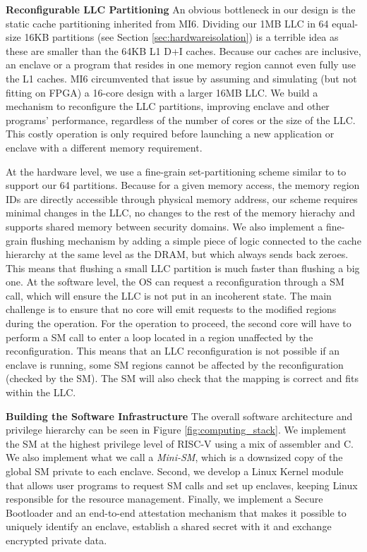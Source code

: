 \noindent\textbf{Reconfigurable LLC Partitioning}
\label{sec:dynamiccache}
An obvious bottleneck in our design is the static cache partitioning inherited from MI6.
Dividing our 1MB LLC in 64 equal-size 16KB partitions (see Section \ref{sec:hardwareisolation}) is a terrible idea as these are
smaller than the 64KB L1 D+I caches.
Because our caches are inclusive, an enclave or a program that resides in one memory region cannot even fully use the L1 caches.
MI6 circumvented that issue by assuming and simulating (but not fitting on FPGA) a 16-core design with a larger 16MB LLC.
We build a mechanism to reconfigure the LLC partitions, improving enclave and other programs' performance, regardless of the number of cores or the size of the LLC.
This costly operation is only required before launching a new application or enclave with a different memory requirement.

At the hardware level, we use a fine-grain set-partitioning scheme similar to \cite{townley2022composable,saileshwar2021bespoke} to support our 64 partitions.
Because for a given memory access, the memory region IDs are directly accessible through physical memory address, our scheme requires minimal changes in the LLC, no changes to the rest of the memory hierachy and supports shared memory between security domains.
We also implement a fine-grain flushing mechanism
by adding a simple piece of logic connected to the cache hierarchy at the same level as the DRAM, but which always sends back zeroes.
This means that flushing a small LLC partition is much faster than flushing a big one.
At the software level, the OS can request a reconfiguration through a SM call, which will ensure the LLC is not put in an incoherent state.
The main challenge is to ensure that no core will emit requests to the modified regions during the operation.
For the operation to proceed, the second core will have to perform a SM call to enter a loop located in a region unaffected by the reconfiguration.
This means that an LLC reconfiguration is not possible if an enclave is running, some SM regions cannot be affected by the reconfiguration (checked by the SM).
The SM will also check that the mapping is correct and fits within the LLC.

\noindent\textbf{Building the Software Infrastructure}
The overall software architecture and privilege hierarchy can be seen in Figure \ref{fig:computing_stack}.
We implement the SM at the highest privilege level of RISC-V using a mix of assembler and C.
We also implement what we call a \emph{Mini-SM}, which is a downsized copy of the global SM private to each enclave.
Second, we develop a Linux Kernel module that allows user programs to request SM calls and set up enclaves, keeping Linux responsible for the resource management.
Finally, we implement a Secure Bootloader and an end-to-end attestation mechanism that makes it possible to uniquely identify an enclave, establish a shared secret with it and exchange encrypted private data.
